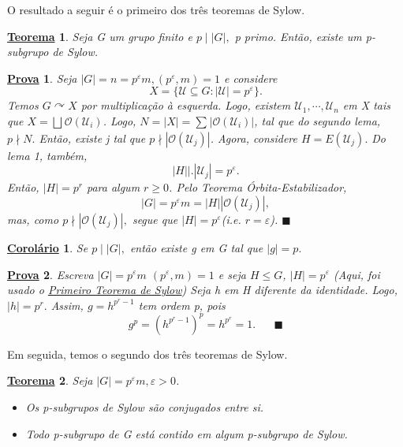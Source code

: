 \documentclass{article}
\newtheorem*{theorem*}{\underline{Teorema}}
\newtheorem*{crl*}{\underline{Corol\'ario}}
\newtheorem*{proof*}{\underline{Prova}}
\renewcommand\qedsymbol{$\blacksquare$}
\begin{document}
  O resultado a seguir é o primeiro dos três teoremas de Sylow.
  \hypertarget{sylow_one}{
 \begin{theorem*}
   Seja G um grupo finito e \(p\mid |G|,\) p primo. Então, existe um p-subgrupo de Sylow.
 \end{theorem*}
} 
\begin{proof*}
  Seja \(|G| = n = p^{\varepsilon }m, (p^{\varepsilon }, m) = 1\) e considere 
    \[
      X = \{\mathcal{U}\subseteq{G}: |\mathcal{U}| = p^{\varepsilon }\}.
    \]
    Temos \(G \curvearrowright X\) por multiplica\c cão à esquerda. Logo, existem 
    \(\mathcal{U}_{1}, \cdots, \mathcal{U}_{n}\) em X tais que \(X = \bigsqcup_{}^{}{\mathcal{O}(\mathcal{U}_{i})}\).
    Logo, \(N = |X| = \sum\limits_{}^{}|\mathcal{O}(\mathcal{U}_{i})|\), tal que do segundo lema,
    \(p\nmid N.\) Então, existe j tal que \(p\nmid|\mathcal{O}(\mathcal{U}_{j})|\).
    Agora, considere \(H = E(\mathcal{U}_{j}).\) Do lema 1, também, 
      \[
        |H|\biggl|\biggr. |\mathcal{U}_{j}| = p^{\varepsilon }.
      \]
    Então, \(|H| = p^{r}\) para algum \(r\geq 0\). Pelo Teorema Órbita-Estabilizador, 
      \[
        |G| = p^{\varepsilon }m = |H||\mathcal{O}(\mathcal{U}_{j})|,
      \]
      mas, como \(p\nmid|\mathcal{O}(\mathcal{U}_{j})|,\) segue que \(|H| = p^{\varepsilon }\)(i.e. \(r=\varepsilon \)). \qedsymbol
\end{proof*} 
\begin{crl*}
  Se \(p\mid |G|,\) então existe g em G tal que \(|g| = p.\)
\end{crl*}
\begin{proof*}
  Escreva \(|G| = p^{\varepsilon }m\) \((p^{\varepsilon }, m) = 1\) e seja \(H\leq G\),
\(|H| = p^{\varepsilon }\) (Aqui, foi usado o \hyperlink{sylow_one}{Primeiro Teorema de Sylow})
Seja h em H diferente da identidade. Logo, \(|h| = p^{r}.\) Assim, \(g = h^{p^{r}-1}\)
tem ordem p, pois 
  \[
    g^{p} = (h^{p^{r}-1})^{p} = h^{p^{r}} = 1.\quad\text{ \qedsymbol}
  \]
\end{proof*}
  Em seguida, temos o segundo dos três teoremas de Sylow.
  \hypertarget{sylow_two}{
 \begin{theorem*}
   Seja \(|G| = p^{\varepsilon }m, \varepsilon >0\).
  \begin{itemize}
    \item[1)] Os p-subgrupos de Sylow são conjugados entre si.
    \item[2)] Todo p-subgrupo de G está contido em algum p-subgrupo de Sylow.
  \end{itemize}
 \end{theorem*}}
\end{document}
